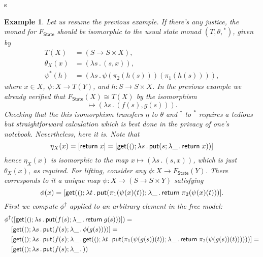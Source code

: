 s\documentclass{amsart}
\newcommand{\theory}[1]{\mathsf{#1}} %
\newcommand{\Free}[2]{F_{\theory{#1}}(#2)} %
\newcommand{\FreeFun}[1]{F_{\theory{#1}}} %
\newcommand{\lam}[1]{\lambda #1 \,.\,}
\newcommand{\unit}{{\text{\small$()$}}} %
\newcommand{\lift}[1]{#1^\dagger} %
\newcommand{\kode}[1]{\mathsf{#1}}
\newcommand{\opcall}[3]{\kode{#1}(#2; #3)}
\newcommand{\return}[1]{\kode{return}\;#1}
\newtheorem{example}[definition]{Example}
\begin{document}
\begin{example}
  Let us resume the previous example. If there's any justice, the monad for
  $\FreeFun{State}$ should be isomorphic to the usual state monad
  $(T, \theta, {}^{*})$, given by
  \begin{align*}
    T(X) &= (S \to S \times X), \\
    \theta_X(x) &= (\lam{s} (s, x)), \\
    \psi^{*}(h) &= (\lam{s} \psi (\pi_2 (h(s))) (\pi_1 (h(s)))),
  \end{align*}
  where $x \in X$, $\psi : X \to T(Y)$, and $h : S \to S \times X$. In the
  previous example we already verified that $\FreeFun{State}(X) \cong T(X)$ by
  the isomorphism
  \begin{equation*}
    [\opcall{get}{\unit}{\lam{s} \opcall{put}{f(s)}{\lam{\_} \return{g(s)}}}]
    \mapsto
    (\lam{s} (f(s), g(s))).
  \end{equation*}
  Checking that the this isomorphism transfers $\eta$ to $\theta$ and
  $\lift{{}}$ to ${}^{*}$ requires a tedious but straightforward calculation
  which is best done in the privacy of one's notebook. Nevertheless, here it is.
  Note that
  \begin{equation*}
    \eta_X(x) = [\return{x}] = [\opcall{get}{\unit}{\lam{s} \opcall{put}{s}{\lam{\_} \return{x}}}]
  \end{equation*}
  hence $\eta_X(x)$ is isomorphic to the map $x \mapsto (\lam{s} (s, x))$, which is
  just $\theta_X(x)$, as required. For lifting, consider any $\phi : X \to \Free{State}{Y}$.
  There corresponds to it a unique map $\psi : X \to (S \to S \times Y)$ satisfying
  \begin{equation*}
    \phi(x) = [\opcall{get}{\unit}{\lam{t} \opcall{put}{\pi_1(\psi(x)(t))}{\lam{\_} \return{\pi_2(\psi(x)(t)}}}].
  \end{equation*}
  First we compute $\lift{\phi}$ applied to an arbitrary element in the free model:
  \begin{align*}
    \lift{\phi}&([\opcall{get}{\unit}{\lam{s} \opcall{put}{f(s)}{\lam{\_} \return{g(s)}}}]) = \\
    &[\opcall{get}{\unit}{\lam{s} \opcall{put}{f(s)}{\lam{\_} \phi(g(s))}}] = \\
    &[\opcall{get}{\unit}{\lam{s} \opcall{put}{f(s)}{\lam{\_}
      \opcall{get}{\unit}{\lam{t} \opcall{put}{\pi_1 (\psi(g(s))(t))}{\lam{\_} \return{\pi_2 (\psi(g(s))(t))}}}
    }}] = \\
    &[\opcall{get}{\unit}{\lam{s} \opcall{put}{f(s)}{\lam{\_}
}}
\end{align*}
\end{example}
\end{document}
